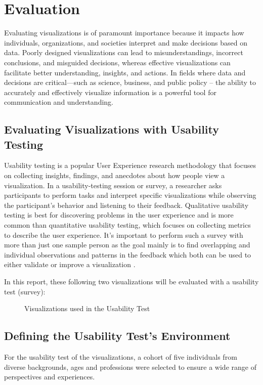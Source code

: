 \chapter{Evaluation}
Evaluating visualizations is of paramount importance because it impacts how individuals, 
organizations, and societies interpret and make decisions based on data. Poorly designed 
visualizations can lead to misunderstandings, incorrect conclusions, and misguided 
decisions, whereas effective visualizations can facilitate better understanding, 
insights, and actions. In fields where data and decisions are critical—such as science, 
business, and public policy -- the ability to accurately and effectively visualize information 
is a powerful tool for communication and understanding.

\section*{Evaluating Visualizations with Usability Testing}
Usability testing is a popular User Experience research methodology that focuses on collecting
insights, findings, and anecdotes about how people view a visualization. In a usability-testing 
session or survey, a researcher asks participants to perform tasks and interpret specific visualizations
while observing the participant's behavior and listening to their feedback. Qualitative usability 
testing is best for discovering problems in the user experience and is more common than quantitative 
usability testing, which focuses on collecting metrics to describe the user experience.
It's important to perform such a survey with more than just one sample person as the goal mainly is to 
find overlapping and individual observations and patterns in the feedback which both can be used to either 
validate or improve a visualization \cite{nngroupUsabilityTestingUsers2018}.

In this report, these following two visualizations will be evaluated with a usability test (survey):
\begin{figure}[htb]%
    \centering
    \qquad
    \caption{Visualizations used in the Usability Test}%
    \label{fig:example}%
\end{figure}

\section*{Defining the Usability Test's Environment}
For the usability test of the visualizations, a cohort of five individuals from diverse backgrounds, ages 
and professions were selected to ensure a wide range of perspectives and experiences. 

